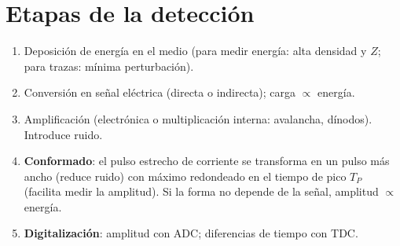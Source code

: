 \section{Etapas de la detección}
\begin{enumerate}
\item Deposición de energía en el medio (para medir energía: alta densidad y $Z$; para trazas: mínima perturbación).
\item Conversión en señal eléctrica (directa o indirecta); carga $\propto$ energía.
\item Amplificación (electrónica o multiplicación interna: avalancha, dínodos). Introduce ruido.
\item \textbf{Conformado}: el pulso estrecho de corriente se transforma en un pulso más ancho (reduce ruido) con máximo
redondeado en el tiempo de pico $T_P$ (facilita medir la amplitud). Si la forma no depende de la señal, amplitud $\propto$ energía.
\item \textbf{Digitalización}: amplitud con ADC; diferencias de tiempo con TDC.
\end{enumerate}
